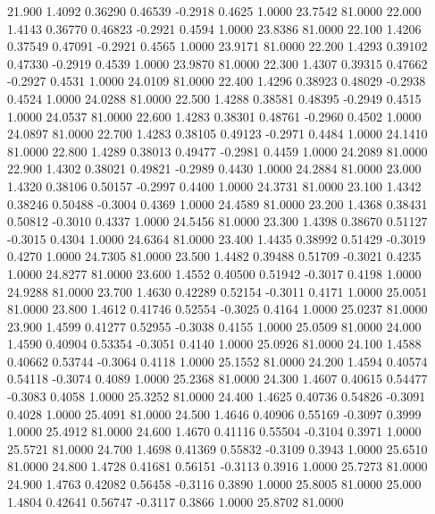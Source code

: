   21.900   1.4092   0.36290   0.46539  -0.2918   0.4625   1.0000  23.7542  81.0000
  22.000   1.4143   0.36770   0.46823  -0.2921   0.4594   1.0000  23.8386  81.0000
  22.100   1.4206   0.37549   0.47091  -0.2921   0.4565   1.0000  23.9171  81.0000
  22.200   1.4293   0.39102   0.47330  -0.2919   0.4539   1.0000  23.9870  81.0000
  22.300   1.4307   0.39315   0.47662  -0.2927   0.4531   1.0000  24.0109  81.0000
  22.400   1.4296   0.38923   0.48029  -0.2938   0.4524   1.0000  24.0288  81.0000
  22.500   1.4288   0.38581   0.48395  -0.2949   0.4515   1.0000  24.0537  81.0000
  22.600   1.4283   0.38301   0.48761  -0.2960   0.4502   1.0000  24.0897  81.0000
  22.700   1.4283   0.38105   0.49123  -0.2971   0.4484   1.0000  24.1410  81.0000
  22.800   1.4289   0.38013   0.49477  -0.2981   0.4459   1.0000  24.2089  81.0000
  22.900   1.4302   0.38021   0.49821  -0.2989   0.4430   1.0000  24.2884  81.0000
  23.000   1.4320   0.38106   0.50157  -0.2997   0.4400   1.0000  24.3731  81.0000
  23.100   1.4342   0.38246   0.50488  -0.3004   0.4369   1.0000  24.4589  81.0000
  23.200   1.4368   0.38431   0.50812  -0.3010   0.4337   1.0000  24.5456  81.0000
  23.300   1.4398   0.38670   0.51127  -0.3015   0.4304   1.0000  24.6364  81.0000
  23.400   1.4435   0.38992   0.51429  -0.3019   0.4270   1.0000  24.7305  81.0000
  23.500   1.4482   0.39488   0.51709  -0.3021   0.4235   1.0000  24.8277  81.0000
  23.600   1.4552   0.40500   0.51942  -0.3017   0.4198   1.0000  24.9288  81.0000
  23.700   1.4630   0.42289   0.52154  -0.3011   0.4171   1.0000  25.0051  81.0000
  23.800   1.4612   0.41746   0.52554  -0.3025   0.4164   1.0000  25.0237  81.0000
  23.900   1.4599   0.41277   0.52955  -0.3038   0.4155   1.0000  25.0509  81.0000
  24.000   1.4590   0.40904   0.53354  -0.3051   0.4140   1.0000  25.0926  81.0000
  24.100   1.4588   0.40662   0.53744  -0.3064   0.4118   1.0000  25.1552  81.0000
  24.200   1.4594   0.40574   0.54118  -0.3074   0.4089   1.0000  25.2368  81.0000
  24.300   1.4607   0.40615   0.54477  -0.3083   0.4058   1.0000  25.3252  81.0000
  24.400   1.4625   0.40736   0.54826  -0.3091   0.4028   1.0000  25.4091  81.0000
  24.500   1.4646   0.40906   0.55169  -0.3097   0.3999   1.0000  25.4912  81.0000
  24.600   1.4670   0.41116   0.55504  -0.3104   0.3971   1.0000  25.5721  81.0000
  24.700   1.4698   0.41369   0.55832  -0.3109   0.3943   1.0000  25.6510  81.0000
  24.800   1.4728   0.41681   0.56151  -0.3113   0.3916   1.0000  25.7273  81.0000
  24.900   1.4763   0.42082   0.56458  -0.3116   0.3890   1.0000  25.8005  81.0000
  25.000   1.4804   0.42641   0.56747  -0.3117   0.3866   1.0000  25.8702  81.0000
